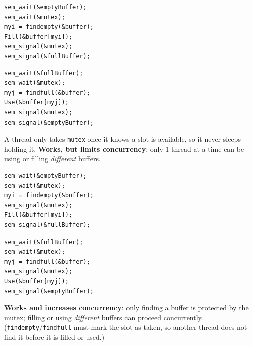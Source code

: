 \documentclass[11pt,a4paper]{article}
\begin{document}
\begin{solbox}
\begin{center}
\begin{minipage}[t]{0.46\textwidth}
\begin{lstlisting}[numbers=none]
sem_wait(&emptyBuffer);
sem_wait(&mutex);
myi = findempty(&buffer);
Fill(&buffer[myi]);
sem_signal(&mutex);
sem_signal(&fullBuffer);
\end{lstlisting}
\end{minipage}\hfill
\begin{minipage}[t]{0.46\textwidth}
\begin{lstlisting}[numbers=none]
sem_wait(&fullBuffer);
sem_wait(&mutex);
myj = findfull(&buffer);
Use(&buffer[myj]);
sem_signal(&mutex);
sem_signal(&emptyBuffer);
\end{lstlisting}
\end{minipage}
\end{center}
A thread only takes \texttt{mutex} once it knows a slot is available, so it
never sleeps holding it. \textbf{Works, but limits concurrency}: only 1
thread at a time can be using or filling \emph{different} buffers.
\end{solbox}

\begin{solbox}
\begin{center}
\begin{minipage}[t]{0.46\textwidth}
\begin{lstlisting}[numbers=none]
sem_wait(&emptyBuffer);
sem_wait(&mutex);
myi = findempty(&buffer);
sem_signal(&mutex);
Fill(&buffer[myi]);
sem_signal(&fullBuffer);
\end{lstlisting}
\end{minipage}\hfill
\begin{minipage}[t]{0.46\textwidth}
\begin{lstlisting}[numbers=none]
sem_wait(&fullBuffer);
sem_wait(&mutex);
myj = findfull(&buffer);
sem_signal(&mutex);
Use(&buffer[myj]);
sem_signal(&emptyBuffer);
\end{lstlisting}
\end{minipage}
\end{center}
\textbf{Works and increases concurrency}: only finding a buffer is
protected by the mutex; filling or using \emph{different} buffers can
proceed concurrently. (\texttt{findempty}/\texttt{findfull} must mark the
slot as taken, so another thread does not find it before it is filled or
used.)
\end{solbox}
\end{document}
